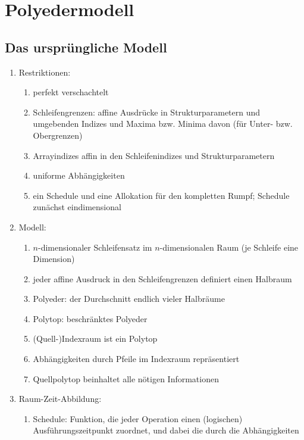 \setcounter{section}{1}
\section{Polyedermodell}
\label{sec:polymod}


\subsection{Das ursprüngliche Modell}
\label{sec:orig-mod}

\begin{enumerate}
\item Restriktionen:
\begin{enumerate}
\item perfekt verschachtelt
\item Schleifengrenzen: affine Ausdrücke in Strukturparametern und umgebenden
  Indizes und Maxima bzw. Minima davon (für Unter- bzw. Obergrenzen)
\item Arrayindizes affin in den Schleifenindizes und Strukturparametern
\item uniforme Abhängigkeiten
\item ein Schedule und eine Allokation für den kompletten Rumpf;
  Schedule zunächst eindimensional
\end{enumerate}
%
\item Modell:
\begin{enumerate}
\item $n$-dimensionaler Schleifensatz im $n$-dimensionalen Raum (je
  Schleife eine Dimension)
\item jeder affine Ausdruck in den Schleifengrenzen definiert einen
  Halbraum
\item Polyeder: der Durchschnitt endlich vieler Halbräume
\item Polytop: beschränktes Polyeder 
\item (Quell-)Indexraum ist ein Polytop
\item Abhängigkeiten durch Pfeile im Indexraum repräsentiert
\item Quellpolytop beinhaltet alle nötigen Informationen
\end{enumerate}
%
\item Raum-Zeit-Abbildung:
\begin{enumerate}
\item Schedule: Funktion, die jeder Operation einen (logischen)
  Ausführungszeitpunkt zuordnet, und dabei die durch die Abhängigkeiten

\end{enumerate}
\end{enumerate}
